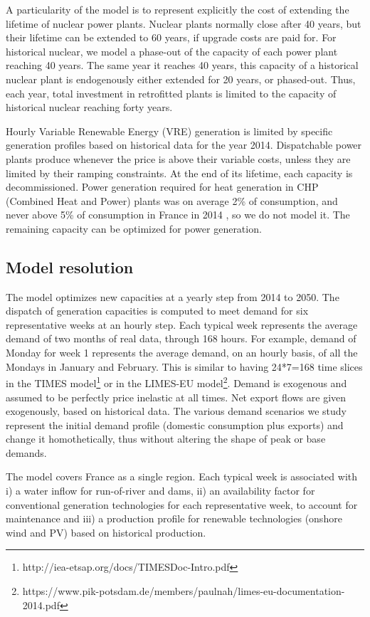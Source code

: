 A particularity of the model is to represent explicitly the cost of extending the lifetime of nuclear power plants.
Nuclear plants normally close after 40 years, but their lifetime can be extended to 60 years, if upgrade costs are paid for.
For historical nuclear, we model a phase-out of the capacity of each power plant reaching 40 years.
The same year it reaches 40 years, this capacity of a historical nuclear plant is endogenously either extended for 20 years, or phased-out. 
Thus, each year, total investment in retrofitted plants is limited to the capacity of historical nuclear reaching forty years.

Hourly Variable Renewable Energy (VRE) generation is limited by specific generation profiles based on historical data for the year 2014.
Dispatchable power plants produce whenever the price is above their variable costs, unless they are limited by their ramping constraints.
At the end of its lifetime, each capacity is decommissioned.
Power generation required for heat generation in CHP (Combined Heat and Power) plants was on average 2\% of consumption, and never above 5\% of consumption in France in 2014 \citep{RTE2014}, so we do not model it.
The remaining capacity can be optimized for power generation.

\subsection{Model resolution}

The model optimizes new capacities at a yearly step from 2014 to 2050. The dispatch of generation capacities is computed to meet demand for six representative weeks at an hourly step. Each typical week represents the average demand of two months of real data, through 168 hours. For example, demand of Monday for week 1 represents the average demand, on an hourly basis, of all the Mondays in January and February. This is similar to having 24*7=168 time slices in the TIMES model\footnote{http://iea-etsap.org/docs/TIMESDoc-Intro.pdf} or in the LIMES-EU model\footnote{https://www.pik-potsdam.de/members/paulnah/limes-eu-documentation-2014.pdf}.
Demand is exogenous and assumed to be perfectly price inelastic at all times. Net export flows are given exogenously, based on historical data. 
The various demand scenarios we study represent the initial demand profile (domestic consumption plus exports) and change it homothetically, thus without altering the shape of peak or base demands.

The model covers France as a single region.
Each typical week is associated with i) a water inflow for run-of-river and dams, ii) an availability factor for conventional generation technologies for each representative week, to account for maintenance and iii) a production profile for renewable technologies (onshore wind and PV) based on historical production.


